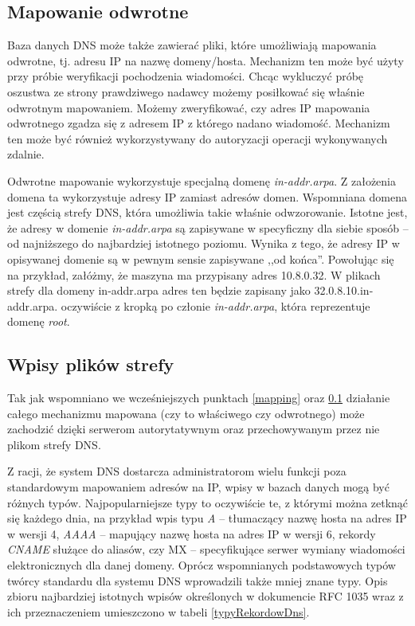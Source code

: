 \subsection{Mapowanie odwrotne}
\label{revmapping}
Baza danych DNS może także zawierać pliki, które umożliwiają mapowania odwrotne, tj. adresu IP na nazwę domeny/hosta. Mechanizm ten
może być użyty przy próbie weryfikacji pochodzenia wiadomości. Chcąc wykluczyć próbę oszustwa ze strony prawdziwego nadawcy możemy
posiłkować się właśnie odwrotnym mapowaniem. Możemy zweryfikować, czy adres IP mapowania odwrotnego zgadza się z adresem IP z którego
nadano wiadomość. Mechanizm ten może być również wykorzystywany do autoryzacji operacji wykonywanych zdalnie.

Odwrotne mapowanie wykorzystuje specjalną domenę \textit{in-addr.arpa}. Z założenia domena ta wykorzystuje adresy IP zamiast adresów
domen.  Wspomniana domena jest częścią strefy DNS, która umożliwia takie właśnie odwzorowanie. Istotne jest, że adresy w domenie
\textit{in-addr.arpa} są zapisywane w specyficzny dla siebie sposób -- od najniższego do najbardziej istotnego poziomu. Wynika z
tego, że adresy IP w opisywanej domenie są w pewnym sensie zapisywane ,,od końca''. Powołując się na przykład, załóżmy, że maszyna
ma przypisany adres 10.8.0.32. W plikach strefy dla domeny in-addr.arpa adres ten będzie zapisany jako 32.0.8.10.in-addr.arpa.
oczywiście z kropką po członie \textit{in-addr.arpa}, która reprezentuje domenę \textit{root}.

\subsection{Wpisy plików strefy}
Tak jak wspomniano we wcześniejszych punktach \ref{mapping} oraz \ref{revmapping} działanie całego mechanizmu mapowana (czy to
właściwego czy odwrotnego) może zachodzić dzięki serwerom autorytatywnym oraz przechowywanym przez nie plikom strefy DNS.

Z racji, że system DNS dostarcza administratorom wielu funkcji poza standardowym mapowaniem adresów na IP, wpisy w bazach danych
mogą być różnych typów. Najpopularniejsze typy to oczywiście te, z którymi można zetknąć się każdego dnia, na przykład wpis typu
\textit{A} -- tłumaczący nazwę hosta na adres IP w wersji 4, \textit{AAAA} -- mapujący nazwę hosta na adres IP w wersji 6, rekordy
\textit{CNAME} służące do aliasów, czy MX -- specyfikujące serwer wymiany wiadomości elektronicznych dla danej domeny. Oprócz
wspomnianych podstawowych typów twórcy standardu dla systemu DNS wprowadzili także mniej znane typy. Opis zbioru najbardziej
istotnych wpisów określonych w dokumencie RFC 1035 \cite{RFC1035} wraz z ich przeznaczeniem umieszczono w tabeli \ref{typyRekordowDns}.

